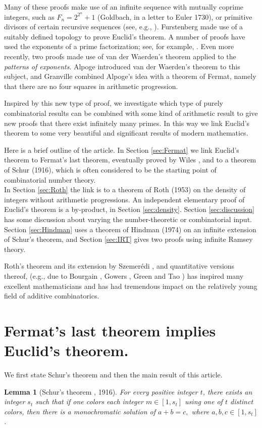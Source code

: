 \documentclass{article}
\theoremstyle{theorem}
\newtheorem{lemma}{Lemma}
\theoremstyle{definition}
\begin{document}
Many of these proofs make use of an infinite sequence
with mutually coprime integers, such as $F_n=2^{2^n}+1$ (Goldbach, in a letter to Euler
1730), or primitive divisors of certain recursive sequences 
(see, e.g., \cite{Saidak:2006}).
Furstenberg \cite{Furstenberg} made use of a suitably defined topology to prove
Euclid's theorem.
A number of proofs have used the exponents of a prime factorization;
see, for example,
\cite{Elsholtz:2012, Erdos:1938, Polya:1918}.
Even more recently, two proofs \cite{Alpoge:2015, Granville}
made use of van der Waerden's theorem
applied to the \emph{patterns of exponents}.
Alpoge \cite{Alpoge:2015} introduced van der Waerden's theorem to this subject,
and Granville \cite{Granville} combined Alpoge's idea with
a theorem of Fermat, namely that there are no 
four squares in arithmetic progression.

Inspired by this new type of 
proof, we investigate which type of purely combinatorial results 
can be combined with some kind of arithmetic result to give new proofs that
there exist infinitely many primes. 
In this way we link Euclid's theorem to some very beautiful and significant 
results of modern mathematics.

Here is a brief outline of the article.
In Section {\ref{sec:Fermat}} we link Euclid's theorem
to Fermat's last theorem,  eventually 
proved by Wiles \cite{Wiles:1995}, and to a theorem of Schur (1916),
which is often considered to be 
the starting point of combinatorial number theory.\\
In Section {\ref{sec:Roth}}
the link is to a theorem of Roth (1953) on the density of integers
without arithmetic progressions.
An independent elementary proof of Euclid's theorem is a by-product, in Section
{\ref{sec:density}}.
Section {\ref{sec:discussion}} has some discussion about varying the
number-theoretic or combinatorial input.
Section {\ref{sec:Hindman}} uses
a theorem of Hindman (1974) on an infinite extension of
Schur's theorem, and Section {\ref{sec:IRT}} gives two proofs using
infinite Ramsey theory.

Roth's theorem and its extension by Szemer\'{e}di
\cite{Szemeredi:1975}, and 
quantitative versions thereof, 
(e.g., due to Bourgain \cite{Bourgain:2008}, Gowers \cite{Gowers:2001}, 
Green and Tao \cite{GreenandTao:2017})
has inspired many excellent mathematicians
 and has had tremendous impact on 
the relatively young field of additive combinatorics.

\section{Fermat's last theorem implies Euclid's theorem.}
{\label{sec:Fermat}}
We first state Schur's theorem and then the main result of this article.
\begin{lemma}[Schur's theorem \cite{Schur}, 1916]
For every positive integer $t$, there exists an integer $s_t$ such that
if one colors each integer $m \in[1,s_t]$ using one of $t$ distinct colors, 
then there is a monochromatic solution of $a+b=c,$ where $a,b,c \in [1,s_t]$.
\end{lemma}
\end{document}

